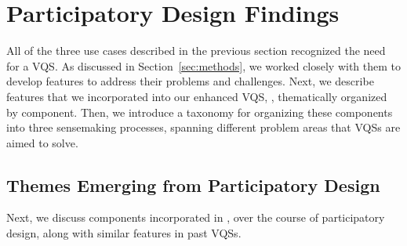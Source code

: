\section{Participatory Design Findings\label{sec:pd_findings}}
All of the three use cases described in the previous section 
recognized the need for a VQS. As discussed in Section~\ref{sec:methods},
we worked closely with them to develop features to address their problems and challenges. 
Next, we describe features that 
we incorporated into our enhanced VQS, \zvpp, 
thematically organized by component. 
Then, we introduce a taxonomy for 
organizing these components 
into three sensemaking processes, 
spanning different problem areas that VQSs are aimed to solve. 
\subsection{Themes Emerging from Participatory Design\label{sec:pd_findings}}
Next, we discuss components 
incorporated in \zvpp, over the course of participatory design, 
along with similar features in past VQSs.

